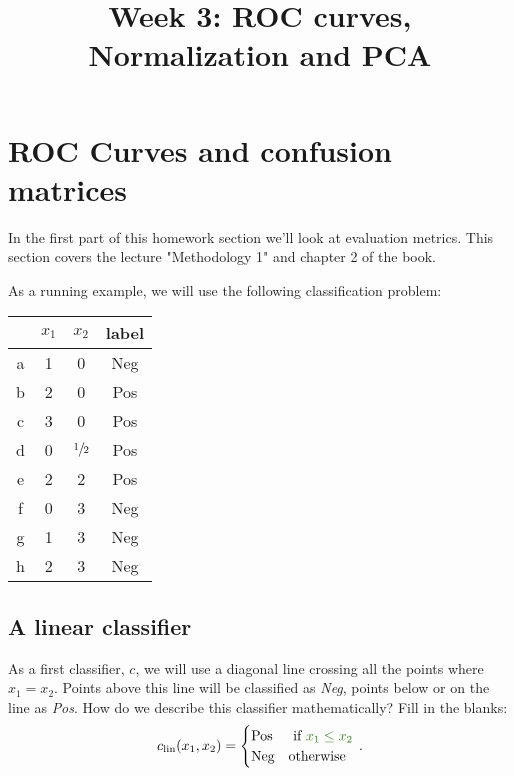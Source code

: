 \documentclass[11pt]{article}
\title{Week 3: ROC curves, Normalization and PCA}
\begin{document}
\maketitle
\section{ROC Curves and confusion matrices}

In the first part of this homework section we'll look at evaluation metrics. This section covers the lecture "Methodology 1" and chapter 2 of the book. 

As a running example, we will use the following classification problem:

\begin{center}
	\begin{tabular}{c c c c}
		& $x_1$ & $x_2$ & label\\
		\hline
		a & 1 & 0 & Neg \\
		b & 2 & 0 & Pos \\
		c & 3 & 0 & Pos \\
		d & 0 & $\sfrac{1}{2}$ & Pos \\
		e & 2 & 2 & Pos \\
		f & 0 & 3 & Neg \\
		g & 1 & 3 & Neg \\
		h & 2 & 3 & Neg \\
		\hline
	\end{tabular}
\end{center}

\subsection{A linear classifier}
	As a first classifier, $c$, we will use a diagonal line crossing all the points where $x_1 = x_2$. Points above this line will be classified as \emph{Neg}, points below or on the line as \emph{Pos}. How do we describe this classifier mathematically? Fill in the blanks:
	\[
	c_\text{lin}(x_1, x_2) = \begin{cases} \text{Pos} & \text{ if } \ans{x_1 \leq x_2}{\ldots} \\ \text{Neg} & \text{otherwise}\end{cases}\p
	\]
	
\end{document}
